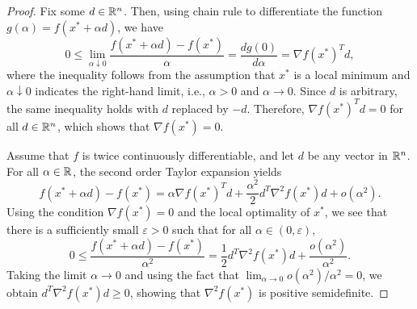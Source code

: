 \documentclass[11pt,a4paper]{article}
\begin{document}
\begin{proof}
    Fix some $d\in \mathbb{R}^n$. Then, using chain rule to differentiate the function $g(\alpha) = f(x^*+\alpha d)$, we have
    \begin{equation*}
        0\le \lim_{\alpha\downarrow 0} \dfrac{f(x^*+\alpha d) - f(x^*)}{\alpha} = \dfrac{dg(0)}{d\alpha} = \nabla f(x^*)^Td,
    \end{equation*}
    where the inequality follows from the assumption that $x^*$ is a local minimum and $\alpha\downarrow 0$ indicates the right-hand limit, i.e., $\alpha>0$ and $\alpha\rightarrow 0$. Since $d$ is arbitrary, the same inequality holds with $d$ replaced by $-d$. Therefore, $\nabla f(x^*)^Td = 0$ for all $d\in\mathbb{R}^n$, which shows that $\nabla f(x^*) = 0$.

    Assume that $f$ is twice continuously differentiable, and let $d$ be any vector in $\mathbb{R}^n$. For all $\alpha\in \mathbb{R}$, the second order Taylor expansion yields
    \begin{equation*}
        f(x^*+\alpha d) - f(x^*) = \alpha \nabla f(x^*)^T d + \frac{\alpha^2}{2} d^T\nabla^2 f(x^*) d + o(\alpha^2).
    \end{equation*}
    Using the condition $\nabla f(x^*) = 0$ and the local optimality of $x^*$, we see that there is a sufficiently small $\varepsilon>0$ such that for all $\alpha\in (0,\varepsilon)$,
    \begin{equation*}
        0\le\dfrac{f(x^*+\alpha d) - f(x^*)}{\alpha^2} = \frac{1}{2}d^T\nabla^2 f(x^*)d + \frac{o(\alpha^2)}{\alpha^2}.
    \end{equation*}
    Taking the limit $\alpha\rightarrow 0$ and using the fact that $\lim_{\alpha\rightarrow 0} o(\alpha^2)/\alpha^2 = 0$, we obtain $d^T\nabla^2 f(x^*)d\ge 0$, showing that $\nabla^2 f(x^*)$ is positive semidefinite.
\end{proof}


    
    
    
    
\end{document}
